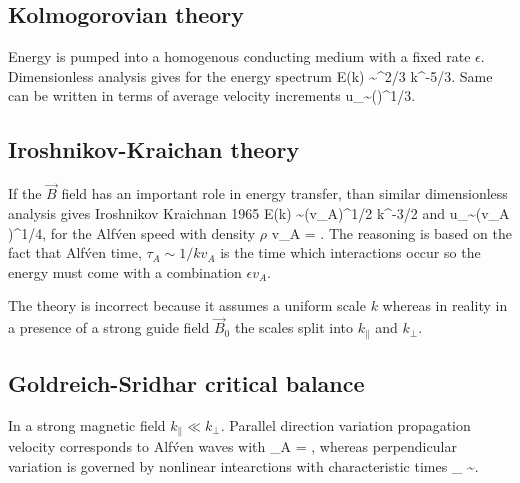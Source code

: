 \documentclass[usenatbib,twocolumn]{aastex63}
\begin{document}
\subsection{Kolmogorovian theory}\label{sect:K41}

Energy is pumped into a homogenous conducting medium with a fixed rate $\epsilon$.
Dimensionless analysis gives for the energy spectrum \citep{Kolmogov_1941}
\be
E(k) \sim \epsilon^{2/3} k^{-5/3}.
\ee
Same can be written in terms of average velocity increments
\be
\delta u_\lambda \sim (\epsilon \lambda)^{1/3}.
\ee

\subsection{Iroshnikov-Kraichan theory}\label{sect:K65}

If the $\vec{B}$ field has an important role in energy transfer, than similar dimensionless analysis gives Iroshnikov Kraichnan 1965
\be
E(k) \sim (\epsilon v_A)^{1/2} k^{-3/2}
\ee
and
\be
\delta u_\lambda \sim (\epsilon v_A \lambda)^{1/4},
\ee
for the Alf\'ven speed with density $\rho$
\be
v_A = .
\ee
The reasoning is based on the fact that Alf\'ven time, $\tau_A \sim 1/k v_A$ is the time which interactions occur so the energy must come with a combination $\epsilon v_A$.

The theory is incorrect because it assumes a uniform scale $k$ whereas in reality in a presence of a strong guide field $\vec{B}_0$ the scales split into $k_{\parallel}$ and $k_{\perp}$.

\subsection{Goldreich-Sridhar critical balance}\label{sect:GS95}

In a strong magnetic field $k_{\parallel} \ll k_{\perp}$.
Parallel direction variation propagation velocity corresponds to Alf\'ven waves with 
\be
\tau_A = ,
\ee
whereas perpendicular variation is governed by nonlinear intearctions with characteristic times
\be
\tau_{} \sim {}.
\ee
\end{document}
